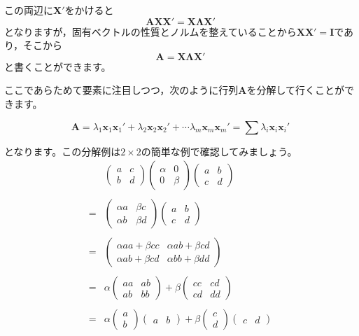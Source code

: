 \documentclass{ltjsbook}
\begin{document}
この両辺に$\bm{X}'$をかけると
\[ \bm{AXX}' = \bm{X \Lambda X}' \]
となりますが，固有ベクトルの性質とノルムを整えていることから$\bm{XX}'=\bm{I}$であり，そこから
\[ \bm{A} = \bm{X \Lambda X}' \]
と書くことができます。

ここであらためて要素に注目しつつ，次のように行列$\bm{A}$を分解して行くことができます。

\[
    \bm{A}= \lambda_1 \bm{x}_1 \bm{x}_1' + \lambda_2 \bm{x}_2 \bm{x}_2' + \cdots \lambda_m \bm{x}_m \bm{x}_m'= \sum \lambda_{i} \bm{x}_{i} \bm{x}_i'
\]

となります。この分解例は$2 \times 2$の簡単な例で確認してみましょう。
\[ 
    \begin{array}{ll}
    & \begin{pmatrix} a & c\\ b & d \end{pmatrix}\begin{pmatrix}\alpha & 0\\ 0&\beta \end{pmatrix}\begin{pmatrix}a & b\\ c & d \end{pmatrix}\\
    &\\
    =& \begin{pmatrix} \alpha a & \beta c \\ \alpha b & \beta d \end{pmatrix}
    \begin{pmatrix}a & b\\ c & d \end{pmatrix}\\
    &\\
    =& \begin{pmatrix} \alpha aa + \beta cc & \alpha ab + \beta cd \\
        \alpha ab + \beta cd & \alpha bb + \beta dd \end{pmatrix}\\
        &\\
    =& \alpha \begin{pmatrix} aa & ab\\ ab & bb \end{pmatrix} + 
    \beta \begin{pmatrix}cc & cd \\ cd & dd \end{pmatrix}\\
    &\\
    =& \alpha \begin{pmatrix}a\\b\end{pmatrix}\begin{pmatrix}a &b\end{pmatrix} +
    \beta \begin{pmatrix} c\\d \end{pmatrix}\begin{pmatrix}c&d\end{pmatrix}
    \end{array}
\]
\end{document}
